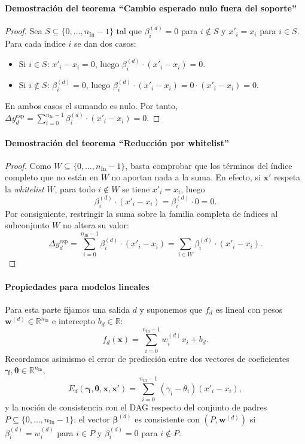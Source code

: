 \documentclass[12pt]{report} %
\begin{document}
\paragraph*{Demostración del teorema ``Cambio esperado nulo fuera del soporte''}
\begin{proof}
    Sea $S \subseteq \{0, \ldots, n_{\text{In}}-1\}$ tal que $\beta_i^{(d)} = 0$ para $i \notin S$ y $x'_i = x_i$ para $i \in S$. Para cada índice $i$ se dan dos casos:
    \begin{itemize}
        \item Si $i \in S$: $x'_i - x_i = 0$, luego $\beta_i^{(d)} \cdot (x'_i - x_i) = 0$.
        \item Si $i \notin S$: $\beta_i^{(d)} = 0$, luego $\beta_i^{(d)} \cdot (x'_i - x_i) = 0 \cdot (x'_i - x_i) = 0$.
    \end{itemize}
    En ambos casos el sumando es nulo. Por tanto, $\Delta y_d^{\text{esp}} = \sum_{i=0}^{n_{\text{In}}-1} \beta_i^{(d)} \cdot (x'_i - x_i) = 0$.
\end{proof}

\paragraph*{Demostración del teorema ``Reducción por whitelist''}
\begin{proof}
    Como $W \subseteq \{0, \ldots, n_{\text{In}}-1\}$, basta comprobar que los términos del índice completo que no están en $W$ no aportan nada a la suma. En efecto, si $\mathbf{x}'$ respeta la \textit{whitelist} $W$, para todo $i \notin W$ se tiene $x'_i = x_i$, luego
    $$\beta_i^{(d)} \cdot (x'_i - x_i) = \beta_i^{(d)} \cdot 0 = 0.$$
    Por consiguiente, restringir la suma sobre la familia completa de índices al subconjunto $W$ no altera su valor:
    $$\Delta y_d^{\text{esp}} = \sum_{i=0}^{n_{\text{In}}-1} \beta_i^{(d)} \cdot (x'_i - x_i) = \sum_{i \in W} \beta_i^{(d)} \cdot (x'_i - x_i).$$
\end{proof}

\paragraph*{Propiedades para modelos lineales}

Para esta parte fijamos una salida $d$ y suponemos que $f_d$ es lineal con pesos $\mathbf{w}^{(d)} \in \mathbb{R}^{n_{\text{In}}}$ e intercepto $b_d \in \mathbb{R}$:
$$f_d(\mathbf{x}) = \sum_{i=0}^{n_{\text{In}}-1} w_i^{(d)} x_i + b_d.$$
Recordamos asimismo el error de predicción entre dos vectores de coeficientes $\boldsymbol{\gamma}, \boldsymbol{\theta} \in \mathbb{R}^{n_{\text{In}}}$,
$$E_d(\boldsymbol{\gamma}, \boldsymbol{\theta}, \mathbf{x}, \mathbf{x}') = \sum_{i=0}^{n_{\text{In}}-1} (\gamma_i - \theta_i)(x'_i - x_i),$$
y la noción de consistencia con el DAG respecto del conjunto de padres $P \subseteq \{0, \ldots, n_{\text{In}}-1\}$: el vector $\boldsymbol{\beta}^{(d)}$ es consistente con $(P, \mathbf{w}^{(d)})$ si $\beta_i^{(d)} = w_i^{(d)}$ para $i \in P$ y $\beta_i^{(d)} = 0$ para $i \notin P$.
\end{document}
